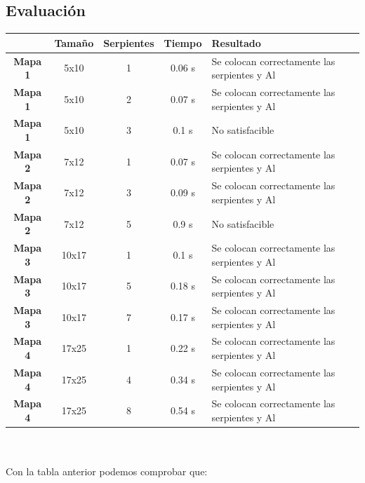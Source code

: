 \documentclass[11pt,spanish]{article}
\begin{document}
		\subsection{Evaluación}
			\begin{tabular}{ |c||c|c|c|l| }
				\hline
				&\textbf{Tamaño}&\textbf{Serpientes}&\textbf{Tiempo}&\textbf{Resultado}\\
				\hline
				\hline
				\textbf{Mapa 1}&5x10&1&0.06 s&Se colocan correctamente las serpientes y Al\\
				\hline
				\textbf{Mapa 1}&5x10&2&0.07 s&Se colocan correctamente las serpientes y Al\\
				\hline
				\textbf{Mapa 1}&5x10&3&0.1 s&No satisfacible\\
				\hline
				\textbf{Mapa 2}&7x12&1&0.07 s&Se colocan correctamente las serpientes y Al\\
				\hline
				\textbf{Mapa 2}&7x12&3&0.09 s&Se colocan correctamente las serpientes y Al\\
				\hline
				\textbf{Mapa 2}&7x12&5&0.9 s&No satisfacible\\
				\hline
				\textbf{Mapa 3}&10x17&1&0.1 s&Se colocan correctamente las serpientes y Al\\
				\hline
				\textbf{Mapa 3}&10x17&5&0.18 s&Se colocan correctamente las serpientes y Al\\
				\hline
				\textbf{Mapa 3}&10x17&7&0.17 s&Se colocan correctamente las serpientes y Al\\
				\hline
				\textbf{Mapa 4}&17x25&1&0.22 s&Se colocan correctamente las serpientes y Al\\
				\hline
				\textbf{Mapa 4}&17x25&4&0.34 s&Se colocan correctamente las serpientes y Al\\
				\hline
				\textbf{Mapa 4}&17x25&8&0.54 s&Se colocan correctamente las serpientes y Al\\
				\hline
			\end{tabular}
			\\
			\\
			Con la tabla anterior podemos comprobar que:
\end{document}
